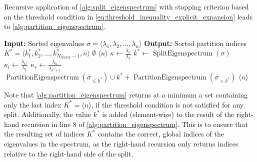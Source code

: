 Recursive application of \cref{alg:split_eigenspectrum} with stopping criterion based on the threshold condition in \cref{eq:threshold_inequality_explicit_expansion} leads to \cref{alg:partition_eigenspectrum}.
\begin{algorithm}[H]
    \caption{$\operatorname{PartitionEigenspectrum}(\sigma)$}
    \begin{algorithmic}[1]
        \State \textbf{Input:} Sorted eigenvalues $\sigma = \langle\lambda_1, \lambda_2, \ldots, \lambda_n\rangle$
        \State \textbf{Output:} Sorted partition indices $K^* = \langle k^*_1, k^*_2, \ldots, k^*_{N_{\text{cluster}}-1}, n\rangle$
        \If{$\sigma = \emptyset$}
            \State \Return $\emptyset$
            \State \Return $\langle n \rangle$
        \EndIf
        \State $\kappa \gets \frac{\lambda_n}{\lambda_1}$
        \State $k^* \gets \operatorname{SplitEigenspectrum}(\sigma)$
        \State $\kappa_l \gets \frac{\lambda_{k^*}}{\lambda_1}$
        \State $\kappa_r \gets \frac{\lambda_n}{\lambda_{k^*+1}}$
        \State \Return $\operatorname{PartitionEigenspectrum}(\sigma_{\leq k^*}) \cup k^* + \operatorname{PartitionEigenspectrum}(\sigma_{>k^*})$
        \Else
        \State \Return $\langle n \rangle$ 
        \EndIf
    \end{algorithmic}
    \label{alg:partition_eigenspectrum}
\end{algorithm}
Note that \cref{alg:partition_eigenspectrum} returns at a minimum a set containing only the last index $K^*= \langle n \rangle$, if the threshold condition is not satisfied for any split. Additionally, the value $k^*$ is added (element-wise) to the result of the right-hand recursion in line 8 of \cref{alg:partition_eigenspectrum}. This is to ensure that the resulting set of indices $K^*$ contains the correct, global indices of the eigenvalues in the spectrum, as the right-hand recursion only returns indices relative to the right-hand side of the split.

